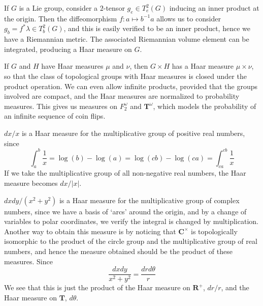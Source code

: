 \begin{example}
    If $G$ is a Lie group, consider a $2$-tensor $g_e \in T^2_e(G)$ inducing an inner product at the origin. Then the diffeomorphism $f: a \mapsto b^{-1}a$ allows us to consider $g_b = f^* \lambda \in T^2_b(G)$, and this is easily verified to be an inner product, hence we have a Riemannian metric. The associated Riemannian volume element can be integrated, producing a Haar measure on $G$.
\end{example}

\begin{example}
    If $G$ and $H$ have Haar measures $\mu$ and $\nu$, then $G \times H$ has a Haar measure $\mu \times \nu$, so that the class of topological groups with Haar measures is closed under the product operation. We can even allow infinite products, provided that the groups involved are compact, and the Haar measures are normalized to probability measures. This gives us measures on $F_2^\omega$ and $\mathbf{T}^\omega$, which models the probability of an infinite sequence of coin flips.
\end{example}

\begin{example}
    $dx/x$ is a Haar measure for the multiplicative group of positive real numbers, since
    \[ \int_a^b \frac{1}{x} = \log(b) - \log(a) = \log(cb) - \log(ca) = \int_{ca}^{cb} \frac{1}{x} \]
    If we take the multiplicative group of all non-negative real numbers, the Haar measure becomes $dx/|x|$.
\end{example}

\begin{example}
    $dx dy/(x^2 + y^2)$ is a Haar measure for the multiplicative group of complex numbers, since we have a basis of `arcs' around the origin, and by a change of variables to polar coordinates, we verify the integral is changed by multiplication. Another way to obtain this measure is by noticing that $\mathbf{C}^\times$ is topologically isomorphic to the product of the circle group and the multiplicative group of real numbers, and hence the measure obtained should be the product of these measures. Since
    \[ \frac{dx dy}{x^2 + y^2} = \frac{dr d\theta}{r} \]
    We see that this is just the product of the Haar measure on $\mathbf{R}^+$, $dr/r$, and the Haar measure on $\mathbf{T}$, $d \theta$.
\end{example}

